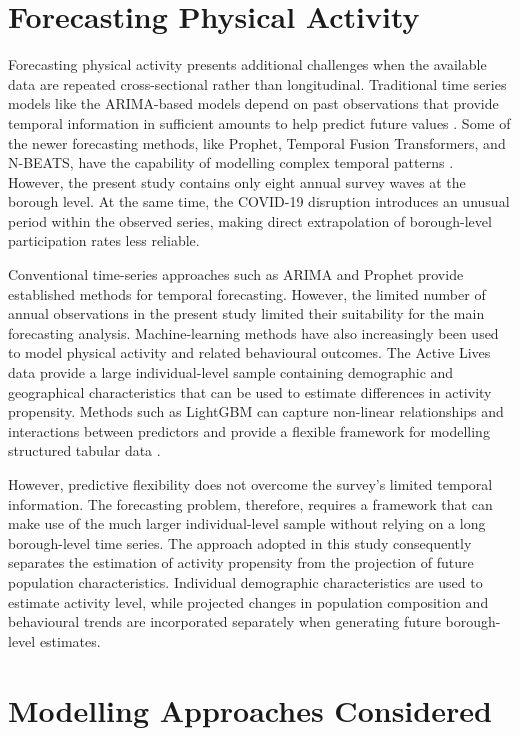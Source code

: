 \documentclass[ %
                    author={Ashrey Ashrey, Sanya Kapoor, Trisha Sharma, Yash Bhooshan Pandloskar},
                supervisor={Dr. Dalila O’Grady},
                    degree={MSc},
                     title={Using machine learning to forecast physical activity participation, volunteering and activity patterns in London},
                  subtitle={},
                      type={},
                      year={2021}]{dissertation}
\begin{document}
\section{Forecasting Physical Activity}

Forecasting physical activity presents additional challenges when the available data are repeated cross-sectional rather than longitudinal. Traditional time series models like the ARIMA-based models depend on past observations that provide temporal information in sufficient amounts to help predict future values \cite{box_jenkins_1970}. Some of the newer forecasting methods, like Prophet, Temporal Fusion Transformers, and N-BEATS, have the capability of modelling complex temporal patterns \cite{taylor_letham_2018,lim_etal_2021,oreshkin_etal_2020}. However, the present study contains only eight annual survey waves at the borough level. At the same time, the COVID-19 disruption introduces an unusual period within the observed series, making direct extrapolation of borough-level participation rates less reliable.

Conventional time-series approaches such as ARIMA and Prophet provide established methods for temporal forecasting. However, the limited number of annual observations in the present study limited their suitability for the main forecasting analysis. Machine-learning methods have also increasingly been used to model physical activity and related behavioural outcomes. The Active Lives data provide a large individual-level sample containing demographic and geographical characteristics that can be used to estimate differences in activity propensity. Methods such as LightGBM can capture non-linear relationships and interactions between predictors and provide a flexible framework for modelling structured tabular data \cite{ke_etal_2017}.

However, predictive flexibility does not overcome the survey's limited temporal information. The forecasting problem, therefore, requires a framework that can make use of the much larger individual-level sample without relying on a long borough-level time series. The approach adopted in this study consequently separates the estimation of activity propensity from the projection of future population characteristics. Individual demographic characteristics are used to estimate activity level, while projected changes in population composition and behavioural trends are incorporated separately when generating future borough-level estimates.

\section{Modelling Approaches Considered}
\end{document}

